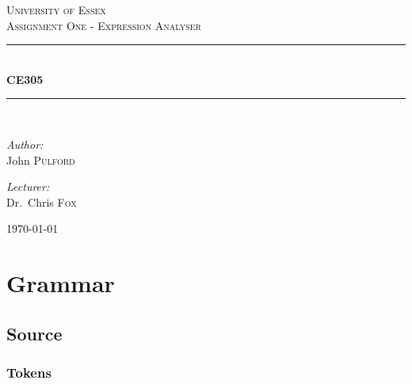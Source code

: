 \documentclass[a4paper,12pt]{article}
\begin{document}
\begin{titlepage}
    \newcommand{\HRule}{\rule{\linewidth}{0.5mm}}
    \begin{center}


        \textsc{\LARGE University of Essex}\\[1.5cm]

        \textsc{\Large Assignment One - Expression Analyser}\\[0.5cm]

        \HRule \\[0.4cm]
        { \huge \bfseries \gls{CE305} \\[0.4cm] }

        \HRule \\[1.5cm]

        \begin{minipage}{0.4\textwidth}
            \begin{flushleft} \large
                \emph{Author:}\\
                John \textsc{Pulford}
            \end{flushleft}
        \end{minipage}
        \begin{minipage}{0.4\textwidth}
            \begin{flushright} \large
                \emph{Lecturer:} \\
                Dr.~Chris \textsc{Fox}
            \end{flushright}
        \end{minipage}

        \vfill

        {\large \today}

    \end{center}
\end{titlepage}

\tableofcontents
\section{Grammar}
\subsection{Source}
\setlength{\grammarparsep}{20pt plus 1pt minus 1pt} %
\setlength{\grammarindent}{12em} %
\subsubsection{Tokens}
\end{document}
